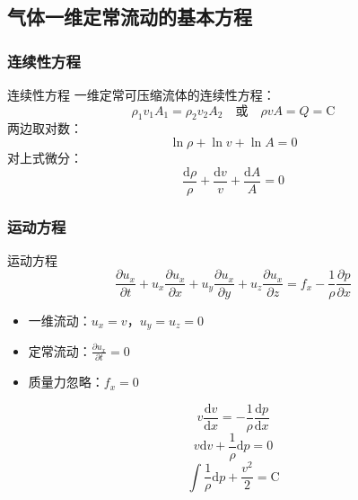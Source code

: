 \subsection{气体一维定常流动的基本方程}
\subsubsection{连续性方程}
\begin{frame}{连续性方程}
  一维定常可压缩流体的连续性方程：
  \begin{equation*}
    \rho_{1}v_{1}A_{1}
    =
    \rho_{2}v_{2}A_{2}
    \quad
    \mbox{或}
    \quad
    \rho vA=Q=\mathrm{C}
  \end{equation*}
  两边取对数：
  \begin{equation*}
    \ln{\rho} 
    +
    \ln{v}
    +
    \ln{A}
    =
    0
  \end{equation*}
  对上式微分：
  \begin{equation*}
  \frac{\mathrm{d}\rho}{\rho}
  +
  \frac{\mathrm{d}v}{v}
  +
  \frac{\mathrm{d}A}{A}
  =
  0
  \end{equation*}
\end{frame}


\subsubsection{运动方程}
\begin{frame}{运动方程}
  \begin{equation*}
  \frac{\partial u_{x}}{\partial t}
  +
  u_{x}\frac{\partial u_{x}}{\partial x}
  +
  u_{y}\frac{\partial u_{x}}{\partial y}
  +
  u_{z}\frac{\partial u_{x}}{\partial z}
  =
  f_{x}
  -
  \frac{1}{\rho}\frac{\partial p}{\partial x}
  \end{equation*}
  \begin{itemize}
    \item 一维流动：$u_{x}=v$，$u_{y}=u_{z}=0$
    \item 定常流动：$\displaystyle \frac{\partial u_{x}}{\partial t}=0$
    \item 质量力忽略：$f_{x}=0$
  \end{itemize}
  \begin{equation*}
  v \frac{\mathrm{d} v}{\mathrm{d} x}
  =
  -
  \frac{1}{\rho}\frac{\mathrm{d} p}{\mathrm{d} x}
  \end{equation*}
  \begin{equation*}
  v\mathrm{d}v
  +
  \frac{1}{\rho}\mathrm{d}p
  =
  0
  \end{equation*}
  \begin{equation*}
    \int{\frac{1}{\rho}}\mathrm{d}p
    +
    \frac{v^{2}}{2}
    =
    \mathrm{C}
  \end{equation*}
\end{frame}

